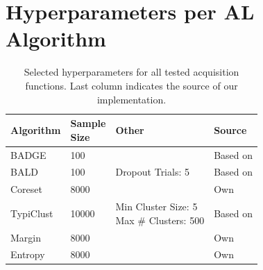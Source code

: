 \documentclass[]{article}
\begin{document}
\section{Hyperparameters per AL Algorithm}\label{app:agent_hyperparameters}
\begin{table}[H]
    \caption{Selected hyperparameters for all tested acquisition functions. Last column indicates the source of our implementation.}
	\centering
	\begin{tabular}{l || l | l | l}
		Algorithm & \makecell{Sample\\Size} & Other & Source\\
		\hline
		BADGE & 100 & & Based on \cite{ashdeep, curelab}\\
		BALD & 100 & Dropout Trials: 5 & Based on \cite{pycls} \\
		Coreset & 8000 & & Own \\
		TypiClust & 10000 & \makecell[tl]{Min Cluster Size: 5\\Max \# Clusters: 500} & Based on \cite{hacohen2022active} \\
		Margin & 8000 & & Own\\
		Entropy & 8000 &  & Own\\
	\end{tabular}
\end{table}
\end{document}
